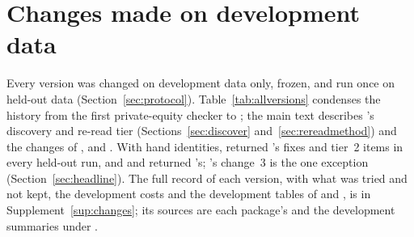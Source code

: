 \section{Changes made on development data}\label{app:changes}
Every version was changed on development data only, frozen, and run once on held-out data (Section~\ref{sec:protocol}). Table~\ref{tab:allversions} condenses the history from the first private-equity checker to ; the main text describes 's discovery and re-read tier (Sections~\ref{sec:discover} and~\ref{sec:rereadmethod}) and the changes of ,  and . With hand identities,  returned 's fixes and tier~2 items in every held-out run, and  and  returned 's; 's change~3 is the one exception (Section~\ref{sec:headline}). The full record of each version, with what was tried and not kept, the development costs and the development tables of  and , is in Supplement~\ref{sup:changes}; its sources are each package's  and the development summaries under .

